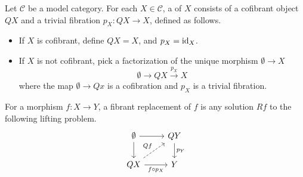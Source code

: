 \documentclass[main.tex]{subfiles}
\begin{document}
\begin{definition}
  \label{def:cofibrant_replacement}
  Let $\mathcal{C}$ be a model category. For each $X \in \mathcal{C}$, a  of $X$ consists of a cofibrant object $QX$ and a trivial fibration $p_{X}\colon QX \to X$, defined as follows.
  \begin{itemize}
    \item If $X$ is cofibrant, define $QX = X$, and $p_{X} = \mathrm{id}_{X}$.

    \item If $X$ is not cofibrant, pick a factorization of the unique morphism $\emptyset \to X$
      \begin{equation*}
        \emptyset \to QX \overset{p_{X}}{\to} X
      \end{equation*}
      where the map $\emptyset \to Qx$ is a cofibration and $p_{X}$ is a trivial fibration.
  \end{itemize}

  For a morphism $f\colon X \to Y$, a fibrant replacement of $f$ is any solution $Rf$ to the following lifting problem.
  \begin{equation*}
    \begin{tikzcd}
      \emptyset
      \arrow[r]
      \arrow[d]
      & QY
      \arrow[d, "p_{Y}"]
      \\
      QX
      \arrow[r, swap, "f \circ p_{X}"]
      \arrow[ur, dashed, "Qf"]
      & Y
    \end{tikzcd}
  \end{equation*}
\end{definition}
\end{document}
